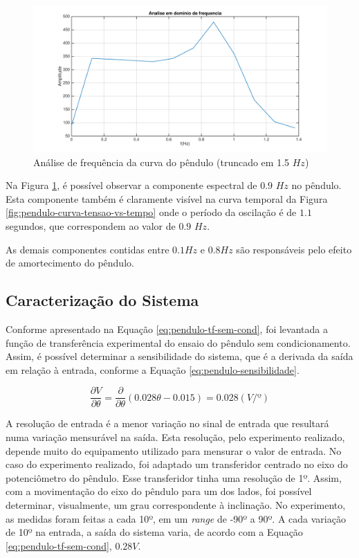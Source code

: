 \documentclass[a4paper]{instrumentacao}
\begin{document}
\begin{figure}[H]
\centering
\includegraphics[width=\textwidth]{frequency-plot-slice.pdf}
\caption{Análise de frequência da curva do pêndulo (truncado em 1.5 $Hz$)}
\label{fig:pendulo-frequencia-truncado}
\end{figure}

Na Figura \ref{fig:pendulo-frequencia-truncado}, é possível observar a componente espectral de $0.9$ $Hz$ no pêndulo. Esta componente também é claramente visível na curva temporal da Figura \ref{fig:pendulo-curva-tensao-vs-tempo} onde o período da oscilação é de $1.1$ segundos, que correspondem ao valor de $0.9$ $Hz$.

As demais componentes contidas entre $0.1 Hz$ e $0.8 Hz$ são responsáveis pelo efeito de amortecimento do pêndulo.

\subsection{Caracterização do Sistema}
Conforme apresentado na Equação \ref{eq:pendulo-tf-sem-cond}, foi levantada a função de transferência experimental do ensaio do pêndulo sem condicionamento. Assim, é possível determinar a sensibilidade do sistema, que é a derivada da saída em relação à entrada, conforme a Equação \ref{eq:pendulo-sensibilidade}.

\begin{equation}
	\frac{\partial V}{\partial \theta}=\frac{\partial}{\partial \theta}(0.028\theta-0.015)=0.028(V/º)
	\label{eq:pendulo-sensibilidade}
\end{equation}

A resolução de entrada é a menor variação no sinal de entrada que resultará numa variação mensurável na saída.  Esta resolução, pelo experimento realizado, depende muito do equipamento utilizado para mensurar o valor de entrada. No caso do experimento realizado, foi adaptado um transferidor centrado no eixo do potenciômetro do pêndulo. Esse transferidor tinha uma resolução de 1º. Assim, com a movimentação do eixo do pêndulo para um dos lados, foi possível determinar, visualmente, um grau correspondente à inclinação. No experimento, as medidas foram feitas a cada 10º, em um \textit{range} de -90º a 90º. A cada variação de 10º na entrada, a saída do sistema varia, de acordo com a Equação \ref{eq:pendulo-tf-sem-cond}, $0.28V$.
\end{document}
